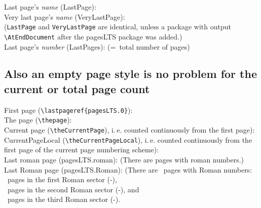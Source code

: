\documentclass[british]{article}
\begin{document}
\noindent Last page's \textit{name} (LastPage): \\

\noindent Very last page's \textit{name} (VeryLastPage): \\
(\texttt{LastPage} and \texttt{VeryLastPage} are identical, unless
a package with output \linebreak
\verb|\AtEndDocument| after the \textsf{pagesLTS} package was added.)\\

\noindent Last page's \textit{number} (LastPages): 
(=~total number of pages)\\

\lipsum[1-4]
\newpage

\subsection[Empty page style]{Also an empty page style is no problem %
for the current or total page count}

\bigskip

\thispagestyle{empty}

\noindent First page (\verb|\lastpageref{pagesLTS.0}|):
\\

\noindent The page (\verb|\thepage|): \thepage \\

\noindent Current page (\verb|\theCurrentPage|),
i.\,e. counted continuously from the first page): \theCurrentPage \\

\noindent CurrentPageLocal (\verb|\theCurrentPageLocal|),
i.\,e. counted continuously from the first page of the
current page numbering scheme): \theCurrentPageLocal \\

\noindent Last roman page (pagesLTS.roman): 
(There are  pages with roman numbers.)\\

\noindent Last Roman page (pagesLTS.Roman): 
(There are ~pages with Roman numbers:\\
~pages in the first Roman sector
(\pageref{Roman}{\hskip3em }-),\\
~pages in the second Roman sector
(\pageref{Roman2}{\hskip3em }-), and\\
~pages in the third Roman sector
(\pageref{Roman3}{\hskip3em }-).\\
\end{document}
